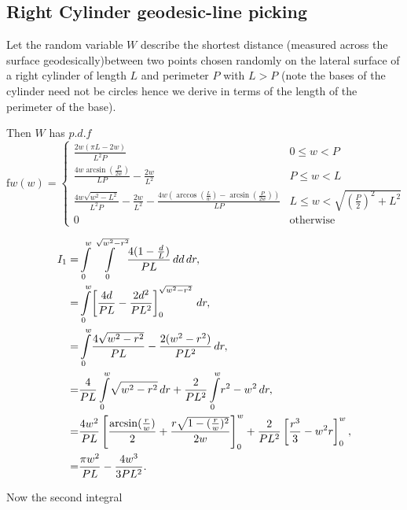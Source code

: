 \subsection{Right Cylinder geodesic-line picking}
\label{sec:prism_geodesic_line}

Let the random variable $W$ describe the shortest distance (measured across the surface geodesically)between two points chosen randomly on the lateral surface of a right cylinder of length $L$ and perimeter $P$ with $L >P$ (note the bases of the cylinder need not be circles hence we derive in terms of the length of the perimeter of the base).  


Then $W$ has $p.d.f$
\begin{equation}
 \text{f}{w}(w) =
 \begin{cases}
  \frac{2 w (\pi  L-2 w)}{L^2 P} & 0 \le w < P \\
 \frac{4 w \arcsin\left(\frac{P}{2 w}\right)}{L P}-\frac{2 w}{L^2}& P\le w <  L \\
 \frac{4 w \sqrt{w^2-L^2}}{L^2 P}-\frac{2 w}{L^2}-\frac{4w \left( \arccos\left(\frac{L}{w}\right)- \arcsin\left(\frac{P}{2 w}\right)\right)}{L P} & L \le w < \sqrt{\left(\frac{P}{2}\right)^2+L^2}\\
 0 & \mbox{otherwise}
 \end{cases}
\end{equation}



\begin{align*}
I_{1}= & \intop_{0}^{w}\intop_{0}^{\sqrt{w^{2}-r^{2}}}\!\frac{4(1-\frac{d}{L})}{PL}\, dd\, dr,\\
= & \intop_{0}^{w}\!\left[\frac{4d}{PL}-\frac{2d^{2}}{PL^{2}}\right]_{0}^{\sqrt{w^{2}-r^{2}}}\, dr,\\
= & \intop_{0}^{w}\!\frac{4\sqrt{w^{2}-r^{2}}}{PL}-\frac{2(w^{2}-r^{2})}{PL^{2}}\, dr,\\
= & \frac{4}{PL}\intop_{0}^{w}\!\sqrt{w^{2}-r^{2}}\, dr+\frac{2}{PL^{2}}\intop_{0}^{w}\! r^{2}-w^{2}\, dr,\\
= & \frac{4w^{2}}{PL}\left[\frac{\arcsin(\frac{r}{w})}{2}+\frac{r\sqrt{1-(\frac{r}{w})^{2}}}{2w}\right]_{0}^{w}+\frac{2}{PL^{2}}\left[\frac{r^{3}}{3}-w^{2}r\right]_{0}^{w},\\
= & \frac{\pi w^{2}}{PL}-\frac{4w^{3}}{3PL^{2}}.\end{align*}


Now the second integral

